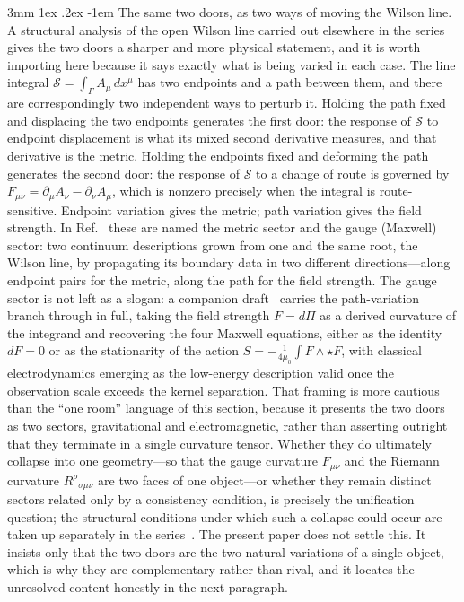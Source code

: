 \documentclass[%
 reprint, amsmath,amssymb, aps, prb, ]{revtex4-2}
\makeatletter
\numberwithin{equation}{section}
\renewcommand\paragraph{%
  \@startsection{paragraph}{4}{\z@}%
    {3mm \@plus 1ex \@minus .2ex}%
    {-1em}%
    {\normalfont\normalsize\itshape}}
\makeatother
\begin{document}
\paragraph{The same two doors, as two ways of moving the Wilson line.}
A structural analysis of the open Wilson line carried out elsewhere in the series~\cite{hanamura55} gives the two doors a sharper and more physical statement, and it is worth importing here because it says exactly what is being varied in each case. The line integral $\mathcal{S}=\int_\Gamma A_\mu\,dx^\mu$ has two endpoints and a path between them, and there are correspondingly two independent ways to perturb it. Holding the path fixed and displacing the two endpoints generates the first door: the response of $\mathcal{S}$ to endpoint displacement is what its mixed second derivative measures, and that derivative is the metric. Holding the endpoints fixed and deforming the path generates the second door: the response of $\mathcal{S}$ to a change of route is governed by $F_{\mu\nu}=\partial_\mu A_\nu-\partial_\nu A_\mu$, which is nonzero precisely when the integral is route-sensitive. Endpoint variation gives the metric; path variation gives the field strength. In Ref.~\cite{hanamura55} these are named the metric sector and the gauge (Maxwell) sector: two continuum descriptions grown from one and the same root, the Wilson line, by propagating its boundary data in two different directions---along endpoint pairs for the metric, along the path for the field strength. The gauge sector is not left as a slogan: a companion draft~\cite{hanamura54} carries the path-variation branch through in full, taking the field strength $F=d\Pi$ as a derived curvature of the integrand and recovering the four Maxwell equations, either as the identity $dF=0$ or as the stationarity of the action $S=-\tfrac{1}{4\mu_0}\!\int F\wedge\star F$, with classical electrodynamics emerging as the low-energy description valid once the observation scale exceeds the kernel separation. That framing is more cautious than the ``one room'' language of this section, because it presents the two doors as two sectors, gravitational and electromagnetic, rather than asserting outright that they terminate in a single curvature tensor. Whether they do ultimately collapse into one geometry---so that the gauge curvature $F_{\mu\nu}$ and the Riemann curvature $R^\rho{}_{\sigma\mu\nu}$ are two faces of one object---or whether they remain distinct sectors related only by a consistency condition, is precisely the unification question; the structural conditions under which such a collapse could occur are taken up separately in the series~\cite{hanamura60}. The present paper does not settle this. It insists only that the two doors are the two natural variations of a single object, which is why they are complementary rather than rival, and it locates the unresolved content honestly in the next paragraph.
\end{document}
